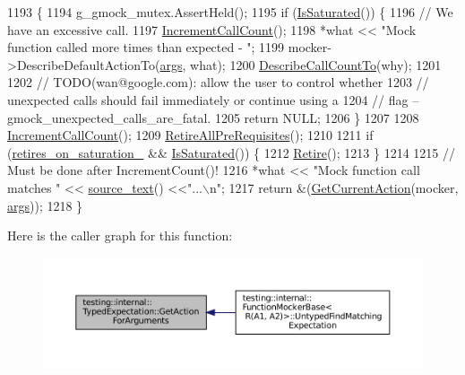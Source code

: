 \begin{DoxyCode}
1193                                                         \{
1194     g\_gmock\_mutex.AssertHeld();
1195     \textcolor{keywordflow}{if} (\hyperlink{classtesting_1_1internal_1_1ExpectationBase_ad3e4340cedefdc24fce1478a8d6cab93}{IsSaturated}()) \{
1196       \textcolor{comment}{// We have an excessive call.}
1197       \hyperlink{classtesting_1_1internal_1_1ExpectationBase_aef1766c39ad6478f9041e0f5c5000532}{IncrementCallCount}();
1198       *what << \textcolor{stringliteral}{"Mock function called more times than expected - "};
1199       mocker->DescribeDefaultActionTo(\hyperlink{namespacegenerate__debs_a75f9143e38df82d83b2e8a6f99cae02c}{args}, what);
1200       \hyperlink{classtesting_1_1internal_1_1ExpectationBase_a2beebed3ade29077bcf294b449bb8b9d}{DescribeCallCountTo}(why);
1201 
1202       \textcolor{comment}{// TODO(wan@google.com): allow the user to control whether}
1203       \textcolor{comment}{// unexpected calls should fail immediately or continue using a}
1204       \textcolor{comment}{// flag --gmock\_unexpected\_calls\_are\_fatal.}
1205       \textcolor{keywordflow}{return} NULL;
1206     \}
1207 
1208     \hyperlink{classtesting_1_1internal_1_1ExpectationBase_aef1766c39ad6478f9041e0f5c5000532}{IncrementCallCount}();
1209     \hyperlink{classtesting_1_1internal_1_1ExpectationBase_afb623801e8de31fcd7b352e200649f7d}{RetireAllPreRequisites}();
1210 
1211     \textcolor{keywordflow}{if} (\hyperlink{classtesting_1_1internal_1_1ExpectationBase_a74802f3bedf4ab023b30ee6bb275a4d8}{retires\_on\_saturation\_} && \hyperlink{classtesting_1_1internal_1_1ExpectationBase_ad3e4340cedefdc24fce1478a8d6cab93}{IsSaturated}()) \{
1212       \hyperlink{classtesting_1_1internal_1_1ExpectationBase_a0aeeb4c1e66c2f2aa0853c267ad3e781}{Retire}();
1213     \}
1214 
1215     \textcolor{comment}{// Must be done after IncrementCount()!}
1216     *what << \textcolor{stringliteral}{"Mock function call matches "} << \hyperlink{classtesting_1_1internal_1_1ExpectationBase_a77efdf254df61cfc4f28c91b0e6f62aa}{source\_text}() <<\textcolor{stringliteral}{"...\(\backslash\)n"};
1217     \textcolor{keywordflow}{return} &(\hyperlink{classtesting_1_1internal_1_1TypedExpectation_a5053b8335ca295b34cd6a68f8d462602}{GetCurrentAction}(mocker, \hyperlink{namespacegenerate__debs_a75f9143e38df82d83b2e8a6f99cae02c}{args}));
1218   \}
\end{DoxyCode}
Here is the caller graph for this function\+:
\nopagebreak
\begin{figure}[H]
\begin{center}
\leavevmode
\includegraphics[width=350pt]{classtesting_1_1internal_1_1TypedExpectation_a2e6b527b4de669f66af63be395f0985d_icgraph}
\end{center}
\end{figure}
